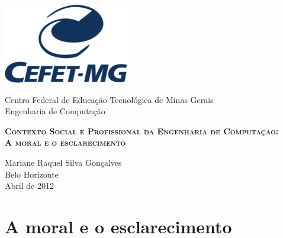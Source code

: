 \documentclass[a4paper,12pt, normaltoc, pnumplain, normalfigtabnum]{style/abntr}
\begin{document}
\begin{titlepage}
\begin{minipage}{0.2\textwidth}
\begin{flushleft} \includegraphics[scale=0.7]{figuras/logo.png}  \end{flushleft}
\end{minipage}
\hfill
\begin{minipage}{0.7\textwidth}  \begin{flushleft} \begin{center} 
Centro Federal de Educação Tecnológica de Minas Gerais \\
Engenharia de Computação
\end{center} \end{flushleft} \end{minipage}

\begin{center}
\vfill
\begin{Large}
\textbf{ \textsc{Contexto Social e Profissional da Engenharia de Computação: \\  A moral e o esclarecimento}} \\[7cm]            
\end{Large}
Mariane Raquel Silva Gonçalves	 \\[3cm]
Belo Horizonte \\ Abril de 2012 \\ 
\end{center}
\end{titlepage}



\section*{A moral e o esclarecimento}



\newpage
\end{document}
